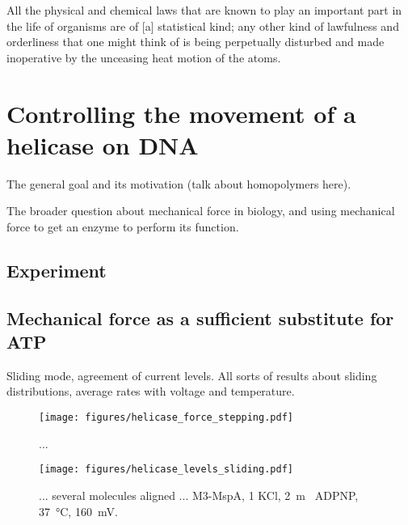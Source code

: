 \begin{savequote}[75mm]
All the physical and chemical laws that are known to play an important part in the life of organisms are of [a] statistical kind; any other kind of lawfulness and orderliness that one might think of is being perpetually disturbed and made inoperative by the unceasing heat motion of the atoms.
\end{savequote}

\chapter{Controlling the movement of a helicase on DNA}
\label{helicase_motion_control}

The general goal and its motivation (talk about homopolymers here).

The broader question about mechanical force in biology, and using mechanical force to get an enzyme to perform its function.

\section{Experiment}

\section{Mechanical force as a sufficient substitute for ATP}

Sliding mode, agreement of current levels.  All sorts of results about sliding distributions, average rates with voltage and temperature.

\begin{figure}[h]
\begin{centering}
\texttt{[image: figures/helicase\_force\_stepping.pdf]}
\caption[Mechanical force substitutes for ATP and moves helicase]{...}
\label{fig:helicase_force_stepping}
\end{centering}
\end{figure}

\begin{figure}[h]
\begin{centering}
\texttt{[image: figures/helicase\_levels\_sliding.pdf]}
\caption[Mechanical force results in the same current levels]{... several molecules aligned ... M3-MspA, \SI{1}{\Molar} KCl, \SI{2}{\m\Molar} ADPNP, \SI{37}{\celsius}, \SI{160}{\mV}.}
\label{fig:helicase_force_stepping_2}
\end{centering}
\end{figure}

